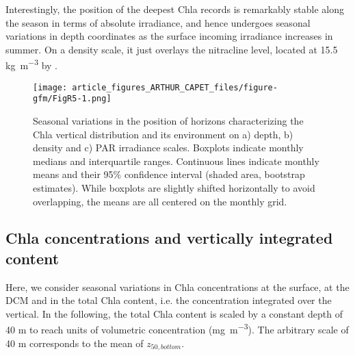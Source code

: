 \documentclass[journal abbreviation, manuscript]{copernicus}
\begin{document}

Interestingly, the position of the deepest Chla records is remarkably stable along the season in terms of absolute irradiance, and hence undergoes seasonal variations in depth coordinates as the surface incoming irradiance increases in summer.
On a density scale, it just overlays the nitracline level, located at 15.5 \unit{kg~m^{-3}} by \cite{Konovalov2006}.

\begin{figure*}[h!] 
    \texttt{[image: article\_figures\_ARTHUR\_CAPET\_files/figure-gfm/FigR5-1.png]}
    \caption{Seasonal variations in the position of horizons characterizing the Chla vertical distribution and its environment on a) depth, b) density and c) PAR irradiance scales.
    Boxplots indicate monthly medians and interquartile ranges.
    Continuous lines indicate monthly means and their 95\% confidence interval (shaded area, bootstrap estimates).
    While boxplots are slightly shifted horizontally to avoid overlapping, the means are all centered on the monthly grid.
    }
    \label{fig:horizons}
\end{figure*}

\subsection{Chla concentrations and vertically integrated content}
Here, we consider seasonal variations in Chla concentrations at the surface, at the DCM and in the total Chla content, i.e. the concentration integrated over the vertical.
In the following, the %
total Chla content is scaled by a constant depth of 40 \unit{m} to reach units of volumetric concentration (\unit{mg~m^{-3}}).
The arbitrary scale of 40 \unit{m} corresponds to the mean of $z_{50,bottom}$.
\end{document}

